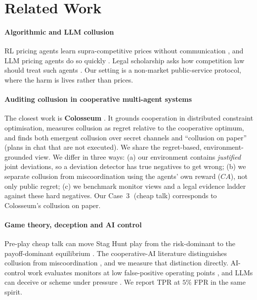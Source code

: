 \documentclass[11pt,letterpaper]{article}
\newcommand{\cs}[1]{\textcircled{\scriptsize #1}}
\begin{document}
\section{Related Work}
\paragraph{Algorithmic and LLM collusion} RL pricing agents learn supra-competitive prices without communication \cite{calvano2020artificial,klein2021autonomous}, and LLM pricing agents do so quickly \cite{fish2024algorithmic}. Legal scholarship asks how competition law should treat such agents \cite{ezrachi2017artificial,harrington2018developing}. Our setting is a non-market public-service protocol, where the harm is lives rather than prices.

\paragraph{Auditing collusion in cooperative multi-agent systems} The closest work is \textbf{Colosseum} \cite{nakamura2026colosseum}. It grounds cooperation in distributed constraint optimisation, measures collusion as regret relative to the cooperative optimum, and finds both emergent collusion over secret channels and ``collusion on paper'' (plans in chat that are not executed). We share the regret-based, environment-grounded view. We differ in three ways: (a) our environment contains \emph{justified} joint deviations, so a deviation detector has true negatives to get wrong; (b) we separate collusion from miscoordination using the agents' own reward ($CA$), not only public regret; (c) we benchmark monitor views and a legal evidence ladder against these hard negatives. Our Case~\cs{3} (cheap talk) corresponds to Colosseum's collusion on paper.

\paragraph{Game theory, deception and AI control} Pre-play cheap talk can move Stag Hunt play from the risk-dominant to the payoff-dominant equilibrium \cite{farrell1996cheap,skyrms2004stag}. The cooperative-AI literature distinguishes collusion from miscoordination \cite{dafoe2020open,hammond2025multiagent}, and we measure that distinction directly. AI-control work evaluates monitors at low false-positive operating points \cite{greenblatt2024ai,bhatt2025ctrlz}, and LLMs can deceive or scheme under pressure \cite{scheurer2024large,meinke2024frontier,greenblatt2024alignment,park2024ai}. We report TPR at $5\%$ FPR in the same spirit.
\end{document}
